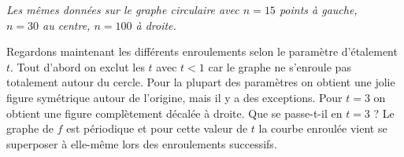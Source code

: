 \documentclass[11pt,class=report,crop=false]{standalone}
\begin{document}
\begin{center}
\begin{minipage}{0.8\textwidth}
\center\emph{
Les mêmes données sur le graphe circulaire avec $n=15$ points à gauche,\\
$n=30$ au centre, $n=100$ à droite. %
}
\end{minipage}

\end{center}



Regardons maintenant les différents enroulements selon le paramètre d'étalement $t$. 
Tout d'abord on exclut les $t$ avec $t<1$ car le graphe ne s'enroule pas totalement autour du cercle. 
Pour la plupart des paramètres on obtient une jolie figure symétrique autour de l'origine, mais il y a des exceptions. 
Pour $t=3$ on obtient une figure complètement décalée à droite. Que se passe-t-il en $t=3$ ? Le graphe de $f$ est périodique et pour cette valeur de $t$ la courbe enroulée vient se superposer à elle-même lors des enroulements successifs.
\end{document}

